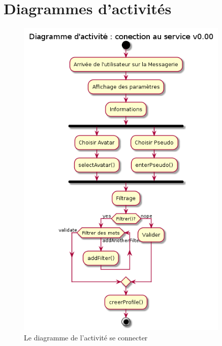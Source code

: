 \documentclass[11pt,dvipsnames,svgnames]{report}
\begin{document}
\section{Diagrammes d'activités}
\begin{figure}[H]
\centerline{\includegraphics[width=0.90\textwidth]{diagrammes/activity-settings-diag.png}}
\caption{Le diagramme de l'activité \og se connecter \fg}
\end{figure}
\end{document}
